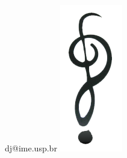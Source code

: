\newpage
\thispagestyle{empty}
\begin{center}
dj@ime.usp.br
\vskip 4cm
\includegraphics[width=0.4\linewidth]{images/doubtsb}
\end{center}
\pagebreak